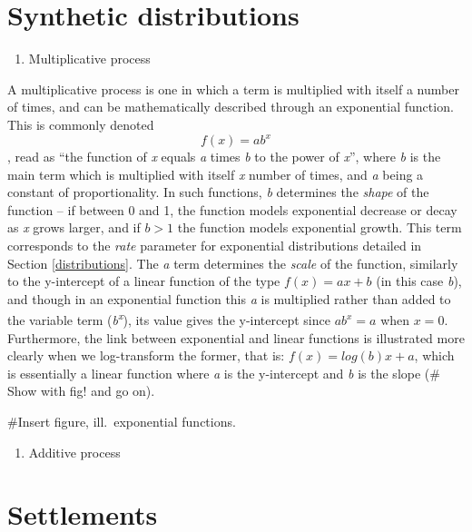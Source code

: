\documentclass[
  12pt,
]{book}
\providecommand{\tightlist}{%
  \setlength{\itemsep}{0pt}\setlength{\parskip}{0pt}}
\begin{document}
\hypertarget{synthetic-distributions}{%
\section{Synthetic distributions}\label{synthetic-distributions}}

\begin{enumerate}
\def\labelenumi{\arabic{enumi}.}
\tightlist
\item
  Multiplicative process
\end{enumerate}

A multiplicative process is one in which a term is multiplied with itself a number of times, and can be mathematically described through an exponential function. This is commonly denoted \[f(x) = ab^x\], read as ``the function of \emph{x} equals \emph{a} times \emph{b} to the power of \emph{x}'', where \emph{b} is the main term which is multiplied with itself \emph{x} number of times, and \emph{a} being a constant of proportionality. In such functions, \emph{b} determines the \emph{shape} of the function -- if between 0 and 1, the function models exponential decrease or decay as \emph{x} grows larger, and if \(b > 1\) the function models exponential growth. This term corresponds to the \emph{rate} parameter for exponential distributions detailed in Section \ref{distributions}. The \emph{a} term determines the \emph{scale} of the function, similarly to the y-intercept of a linear function of the type \(f(x) = ax+b\) (in this case \emph{b}), and though in an exponential function this \emph{a} is multiplied rather than added to the variable term (\emph{b\textsuperscript{x}}), its value gives the y-intercept since \(ab^x = a\) when \(x = 0\). Furthermore, the link between exponential and linear functions is illustrated more clearly when we log-transform the former, that is: \(f(x) = log(b)x+a\), which is essentially a linear function where \emph{a} is the y-intercept and \emph{b} is the slope (\# Show with fig! and go on).

\#Insert figure, ill.~exponential functions.

\begin{enumerate}
\def\labelenumi{\arabic{enumi}.}
\tightlist
\item
  Additive process
\end{enumerate}

\hypertarget{settlements}{%
\section{Settlements}\label{settlements}}
\end{document}

